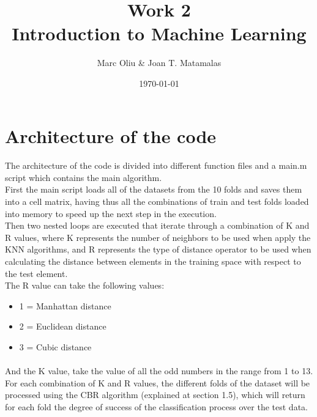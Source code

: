 \documentclass[12pt, a4paper]{article}
\title{Work 2\\Introduction to Machine Learning}
\author{Marc Oliu \& Joan T. Matamalas}
\date{\today}
\begin{document}
\ifpdf
{}
\else
{}
\fi

\maketitle

\tableofcontents

\listoftables

\newpage

\section{Architecture of the code} %
\label{sec:architecture_of_the_code}
\paragraph{}The architecture of the code is divided into different function files and a main.m script which contains the main algorithm.\\

First the main script loads all of the datasets from the 10 folds and saves them into a cell matrix, having thus all the combinations of train and test folds loaded into memory to speed up the next step in the execution.\\

Then two nested loops are executed that iterate through a combination of K and R values, where K represents the number of neighbors to be used when apply the KNN algorithms, and R represents the type of distance operator to be used when calculating the distance between elements in the training space with respect to the test element.\\

The R value can take the following values:
\begin{itemize}
	\item 1 = Manhattan distance
	\item 2 = Euclidean distance
	\item 3 = Cubic distance
\end{itemize}
\paragraph{}And the K value, take the value of all the odd numbers in the range from 1 to 13.\\

For each combination of K and R values, the different folds of the dataset will be processed using the CBR algorithm (explained at section 1.5), which will return for each fold the degree of success of the classification process over the test data.\\
\end{document}
